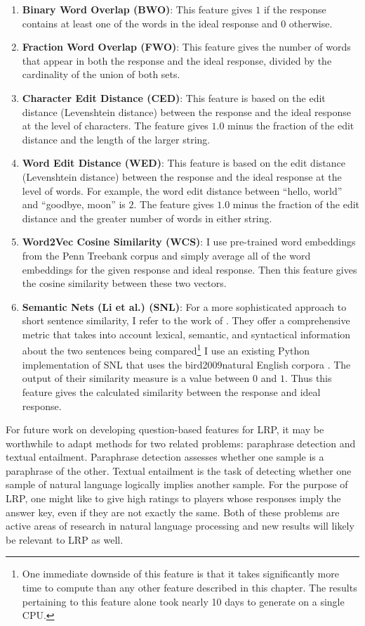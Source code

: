 \begin{enumerate}
\item \textbf{Binary Word Overlap (BWO)}: This feature gives $1$ if the response contains at least one of the words in the ideal response and $0$ otherwise.
\item \textbf{Fraction Word Overlap (FWO)}: This feature gives the number of words that appear in both the response and the ideal response, divided by the cardinality of the union of both sets.
\item \textbf{Character Edit Distance (CED)}: This feature is based on the edit distance (Levenshtein distance) between the response and the ideal response at the level of characters. The feature gives $1.0$ minus the fraction of the edit distance and the length of the larger string.
\item \textbf{Word Edit Distance (WED)}:  This feature is based on the edit distance (Levenshtein distance) between the response and the ideal response at the level of words. For example, the word edit distance between ``hello, world'' and ``goodbye, moon'' is $2$. The feature gives $1.0$ minus the fraction of the edit distance and the greater number of words in either string.
\item \textbf{Word2Vec Cosine Similarity (WCS)}: I use pre-trained word embeddings from the Penn Treebank corpus and simply average all of the word embeddings for the given response and ideal response. Then this feature gives the cosine similarity between these two vectors.
\item \textbf{Semantic Nets (Li et al.) (SNL)}: For a more sophisticated approach to short sentence similarity, I refer to the work of \citet{li2006sentence}. They offer a comprehensive metric that takes into account lexical, semantic, and syntactical information about the two sentences being compared\footnote{One immediate downside of this feature is that it takes significantly more time to compute than any other feature described in this chapter. The results pertaining to this feature alone took nearly 10 days to generate on a single CPU.} I use an existing Python implementation of SNL that uses the bird2009natural English corpora  \citep{bird2009natural}. The output of their similarity measure is a value between $0$ and $1$. Thus this feature gives the calculated similarity between the response and ideal response.
\end{enumerate}

For future work on developing question-based features for LRP, it may be worthwhile to adapt methods for two related problems: paraphrase detection and textual entailment. Paraphrase detection assesses whether one sample is a paraphrase of the other. Textual entailment is the task of detecting whether one sample of natural language logically implies another sample. For the purpose of LRP, one might like to give high ratings to players whose responses imply the answer key, even if they are not exactly the same. Both of these problems are active areas of research in natural language processing and new results will likely be relevant to LRP as well.

